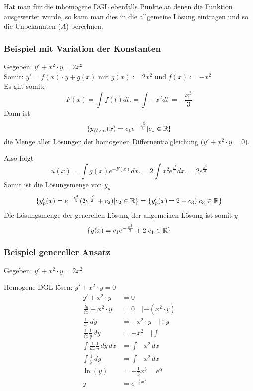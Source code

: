 Hat man für die inhomogene DGL ebenfalls Punkte an denen die Funktion ausgewertet wurde,
so kann man dies in die allgemeine Lösung eintragen und so die Unbekannten ($A$) berechnen.

\subsubsection{Beispiel mit Variation der Konstanten}
Gegeben: $y' + x^2 \cdot y = 2x^2$\\
Somit:  $y' = f(x) \cdot y + g(x)$ mit $g(x) := 2x^2$ und $f(x) :=  - x^2$\\
Es gilt somit:\[
F(x) = \int f(t) dt. =  \int - x^2 dt. = -\frac{x^3}{3}
\]
Dann ist \[
\{y_{Hom}(x) = c_1e^{-\frac{x^3}{3}}| c_1 \in \mathbb{R}\}
\] die Menge aller Lösungen der homogenen Differnentialgleichung ($y' + x^2\cdot y = 0$). \\


Also folgt\[
u(x) = \int  g(x)e^{-F(x)} dx. =  2 \int  x^2e^{\frac{x^3}{3}} dx. = 2e^{\frac{x^3}{3}}
\]
Somit ist die Lösungsmenge von $y_p$
\[
\{ y_p'(x) = e^{-\frac{x^3}{3}} (2e^{\frac{x^3}{3}} + c_2) | c_2 \in \mathbb{R} \}
= \{ y_p'(x) =2 + c_3) | c_3 \in \mathbb{R} \}
\]
Die Lösungsmenge der generellen Lösung der allgemeinen Lösung ist somit $y$\[
\{ y(x) =  c_1e^{-\frac{x^3}{3}} +  2  | c_1 \in \mathbb{R} \}
\]

\subsubsection{Beispiel genereller Ansatz}
Gegeben: $y' + x^2 \cdot y = 2x^2$

Homogene DGL lösen: $y' + x^2 \cdot y = 0$
\begin{align*}
y' + x^2 \cdot y &= 0\\
\frac{dy}{dx} + x^2 \cdot y &= 0 \quad | -(x^2 \cdot y)\\
\frac{1}{dx}\, dy &= -x^2 \cdot y \quad | \div y\\
\frac{1}{dx} \frac{1}{y} \, dy &= -x^2 \quad | \int\\
\int \frac{1}{dx} \frac{1}{y} \, dy \, dx &= \int -x^2 \, dx\\
\int \frac{1}{y}\, dy &= \int -x^2 \, dx\\
\ln(y) &= -\frac{1}{3} x^3 \quad | e^\alpha\\
y &= e^{-\frac{1}{3}x^3}
\end{align*}

